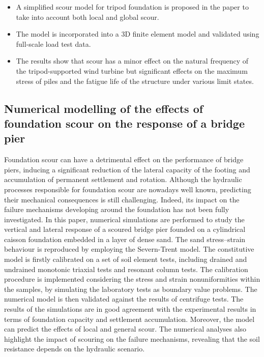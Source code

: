 \documentclass[
  letterpaper,
  DIV=11,
  numbers=noendperiod]{scrreprt}
\providecommand{\tightlist}{%
  \setlength{\itemsep}{0pt}\setlength{\parskip}{0pt}}\usepackage{longtable,booktabs,array}
\begin{document}
\begin{itemize}
\tightlist
\item
  A simplified scour model for tripod foundation is proposed in the
  paper to take into account both local and global scour.
\item
  The model is incorporated into a 3D finite element model and validated
  using full-scale load test data.
\item
  The results show that scour has a minor effect on the natural
  frequency of the tripod-supported wind turbine but significant effects
  on the maximum stress of piles and the fatigue life of the structure
  under various limit states.
\end{itemize}

\hypertarget{numerical-modelling-of-the-effects-of-foundation-scour-on-the-response-of-a-bridge-pier}{%
\subsection{Numerical modelling of the effects of foundation scour on
the response of a bridge
pier}\label{numerical-modelling-of-the-effects-of-foundation-scour-on-the-response-of-a-bridge-pier}}

Foundation scour can have a detrimental effect on the performance of
bridge piers, inducing a signiﬁcant reduction of the lateral capacity of
the footing and accumulation of permanent settlement and rotation.
Although the hydraulic processes responsible for foundation scour are
nowadays well known, predicting their mechanical consequences is still
challenging. Indeed, its impact on the failure mechanisms developing
around the foundation has not been fully investigated. In this paper,
numerical simulations are performed to study the vertical and lateral
response of a scoured bridge pier founded on a cylindrical caisson
foundation embedded in a layer of dense sand. The sand stress--strain
behaviour is reproduced by employing the Severn-Trent model. The
constitutive model is ﬁrstly calibrated on a set of soil element tests,
including drained and undrained monotonic triaxial tests and resonant
column tests. The calibration procedure is implemented considering the
stress and strain nonuniformities within the samples, by simulating the
laboratory tests as boundary value problems. The numerical model is then
validated against the results of centrifuge tests. The results of the
simulations are in good agreement with the experimental results in terms
of foundation capacity and settlement accumulation. Moreover, the model
can predict the effects of local and general scour. The numerical
analyses also highlight the impact of scouring on the failure
mechanisms, revealing that the soil resistance depends on the hydraulic
scenario.
\end{document}

